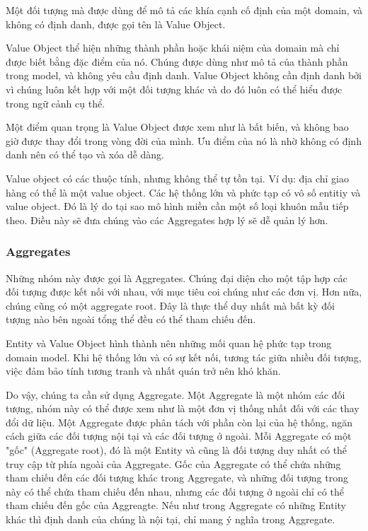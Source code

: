 Một đối tượng mà được dùng để mô tả các khía cạnh cố định của một domain, và không có định danh, được gọi tên là Value Object.

Value Object thể hiện những thành phần hoặc khái niệm của domain mà chỉ được biết bằng đặc điểm của nó. Chúng được dùng như mô tả của thành phần trong model, và không yêu cầu định danh. Value Object không cần định danh bởi vì chúng luôn kết hợp với một đối tượng khác và do đó luôn có thể hiểu được trong ngữ cảnh cụ thể.

Một điểm quan trọng là Value Object được xem như là bất biến, và không bao giờ được thay đổi trong vòng đời của mình. Ưu điểm của nó là nhờ không có định danh nên có thể tạo và xóa dễ dàng.

Value object có các thuộc tính, nhưng không thể tự tồn tại. Ví dụ: địa chỉ giao hàng có thể là một value object. Các hệ thống lớn và phức tạp có vô số entitiy và value object. Đó là lý do tại sao mô hình miền cần một số loại khuôn mẫu tiếp theo. Điều này sẽ đưa chúng vào các Aggregates hợp lý sẽ dễ quản lý hơn.

\subsubsection{Aggregates}

Những nhóm này được gọi là Aggregates. Chúng đại diện cho một tập hợp các đối tượng được kết nối với nhau, với mục tiêu coi chúng như các đơn vị. Hơn nữa, chúng cũng có một aggregate root. Đây là thực thể duy nhất mà bất kỳ đối tượng nào bên ngoài tổng thể đều có thể tham chiếu đến.

Entity và Value Object hình thành nên những mối quan hệ phức tạp trong domain model. Khi hệ thống lớn và có sự kết nối, tương tác giữa nhiều đối tượng, việc đảm bảo tính tương tranh và nhất quán trở nên khó khăn.

Do vậy, chúng ta cần sử dụng Aggregate. Một Aggregate là một nhóm các đối tượng, nhóm này có thể được xem như là một đơn vị thống nhất đối với các thay đổi dữ liệu. Một Aggregate được phân tách với phần còn lại của hệ thống, ngăn cách giữa các đối tượng nội tại và các đối tượng ở ngoài. Mỗi Aggregate có một "gốc" (Aggregate root), đó là một Entity và cũng là đối tượng duy nhất có thể truy cập từ phía ngoài của Aggregate. Gốc của Aggregate có thể chứa những tham chiếu đến các đối tượng khác trong Aggregate, và những đối tượng trong này có thể chứa tham chiếu đến nhau, nhưng các đối tượng ở ngoài chỉ có thể tham chiếu đến gốc của Aggreagte. Nếu như trong Aggregate có những Entity khác thì định danh của chúng là nội tại, chỉ mang ý nghĩa trong Aggregate.

